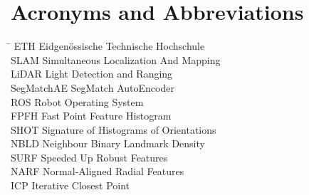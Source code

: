 \section*{Acronyms and Abbreviations}
\begin{tabbing}
 \hspace*{2.6cm}  \= \kill
 ETH \> Eidgenössische Technische Hochschule \\[0.5ex]
 SLAM \> Simultaneous Localization And Mapping \\[0.5ex]
 LiDAR \> Light Detection and Ranging \\[0.5ex]
 SegMatchAE \> SegMatch AutoEncoder \\[0.5ex]
 ROS \> Robot Operating System \\[0.5ex]
 FPFH \> Fast Point Feature Histogram\\[0.5ex]
 SHOT \> Signature of Histograms of Orientations\\[0.5ex]
 NBLD \> Neighbour Binary Landmark Density\\[0.5ex]
 SURF \> Speeded Up Robust Features\\[0.5ex]
 NARF \> Normal-Aligned Radial Features\\[0.5ex]
 ICP \> Iterative Closest Point\\[0.5ex]
\end{tabbing}
